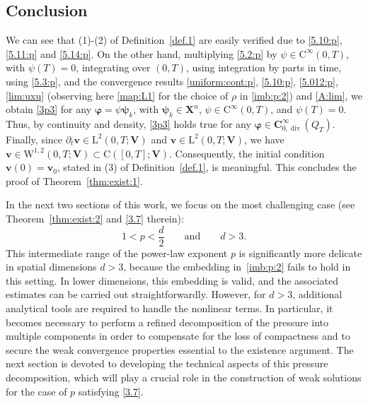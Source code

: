\documentclass[12pt,reqno]{amsart}
\numberwithin{equation}{section}
\theoremstyle{definition}
\def\div{\operatorname{div}}
\def\W{\mathrm{W}}
\def\L{\mathrm{L}}
\def\vv{\boldsymbol{v}}
\def\C{\mathrm{C}}
\def\bfC{\mathbf{C}}
\def\bfX{\mathbf{X}}
\def\bfV{\mathbf{V}}
\def\bfX{\mathbf{X}}
\def\bfi{\boldsymbol{\varphi}}
\def\bpsi{\boldsymbol{\psi}}
\begin{document}
\subsection{Conclusion}
We can see that (1)-(2) of Definition~\ref{def.1} are easily verified due to \eqref{5.10:p}, \eqref{5.11:p} and \eqref{5.14:p}.
On the other hand, multiplying \eqref{5.2:p} by $\psi\in\C^\infty(0,T)$, with $\psi(T)=0$, integrating over $(0,T)$, using integration by parts in time, using \eqref{5.3:p}, and the convergence results \eqref{uniform:cont:p}, \eqref{5.10:p},  \eqref{5.012:p}, \eqref{lim:uxu} (observing here \eqref{map:L1} for the choice of $\rho$ in \eqref{imb:p:2}) and \eqref{A:lim}, we obtain \eqref{3p3} for any {$\bfi=\psi\bpsi_{k}$}, with $\bpsi_{k}\in \bfX^n$, $\psi\in\C^\infty(0,T)$, and $\psi(T)=0$. Thus, by continuity and density, \eqref{3p3} holds true for any $\bfi\in \bfC^\infty_{0,\div}(Q_T)$.
Finally, since $\partial_t\vv \in \L^2(0,T;\bfV)$ and $\vv\in \L^2(0,T;\bfV)$, we have
$\vv \in \W^{1,2}(0,T;\bfV) \subset \C([0,T];\bfV)$.
Consequently, the initial condition $\vv(0)=\vv_0$, stated in (3) of Definition~\ref{def.1}, is meaningful.
This concludes the proof of Theorem~\ref{thm:exist:1}.

\medskip
{
In the next two sections of this work, we focus on the most challenging case (see Theorem~\ref{thm:exist:2} and \eqref{3.7} therein):
{\begin{equation*}%
1<p<\frac{d}{2}\qquad \mbox{and}\qquad d>3.
\end{equation*}
}
This intermediate range of the power-law exponent $p$ is significantly more delicate in spatial dimensions $d>3$, because the embedding in~\eqref{imb:p:2} fails to hold in this setting.
In lower dimensions, this embedding is valid, and the associated estimates can be carried out straightforwardly.
However, for $d>3$, additional analytical tools are required to handle the nonlinear terms. In particular, it becomes necessary to perform a refined decomposition of the pressure into multiple components in order to compensate for the loss of compactness and to secure the weak convergence properties essential to the existence argument.
The next section is devoted to developing the technical aspects of this pressure decomposition, which will play a crucial role in the construction of weak solutions for the case of $p$ satisfying \eqref{3.7}.
}
\end{document}
